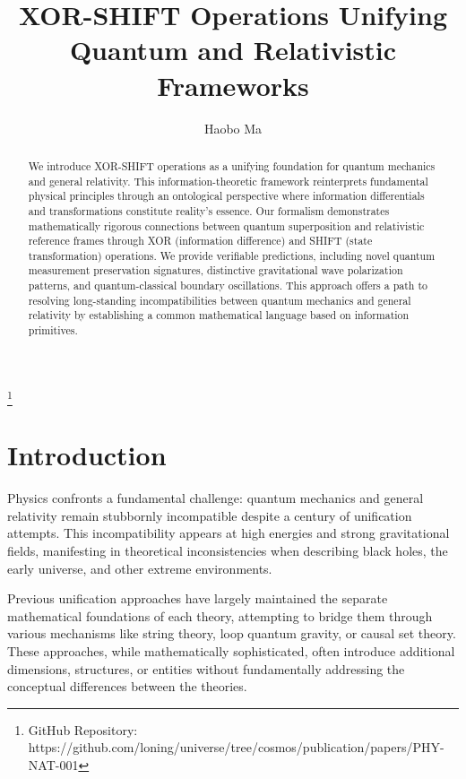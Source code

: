 \documentclass[aps,prl,preprint,superscriptaddress,showpacs]{revtex4-2}
\begin{document}
\title{XOR-SHIFT Operations Unifying Quantum and Relativistic Frameworks}

\author{Haobo Ma}
\thanks{GitHub Repository: https://github.com/loning/universe/tree/cosmos/publication/papers/PHY-NAT-001}

\begin{abstract}
We introduce XOR-SHIFT operations as a unifying foundation for quantum mechanics and general relativity. This information-theoretic framework reinterprets fundamental physical principles through an ontological perspective where information differentials and transformations constitute reality's essence. Our formalism demonstrates mathematically rigorous connections between quantum superposition and relativistic reference frames through XOR (information difference) and SHIFT (state transformation) operations. We provide verifiable predictions, including novel quantum measurement preservation signatures, distinctive gravitational wave polarization patterns, and quantum-classical boundary oscillations. This approach offers a path to resolving long-standing incompatibilities between quantum mechanics and general relativity by establishing a common mathematical language based on information primitives.
\end{abstract}

\maketitle

\section{Introduction}

Physics confronts a fundamental challenge: quantum mechanics and general relativity remain stubbornly incompatible despite a century of unification attempts. This incompatibility appears at high energies and strong gravitational fields, manifesting in theoretical inconsistencies when describing black holes, the early universe, and other extreme environments.

Previous unification approaches have largely maintained the separate mathematical foundations of each theory, attempting to bridge them through various mechanisms like string theory, loop quantum gravity, or causal set theory. These approaches, while mathematically sophisticated, often introduce additional dimensions, structures, or entities without fundamentally addressing the conceptual differences between the theories.
\end{document}
